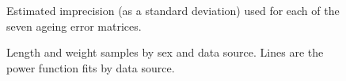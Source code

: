 \documentclass[
]{scrartcl}
\begin{document}
\begin{figure}[H]


\caption{\label{fig-AE_SD}Estimated imprecision (as a standard
deviation) used for each of the seven ageing error matrices.}

\end{figure}%

\newpage

\begin{figure}[H]


\caption{\label{fig-LW1}Length and weight samples by sex and data
source. Lines are the power function fits by data source.}

\end{figure}%
\end{document}
